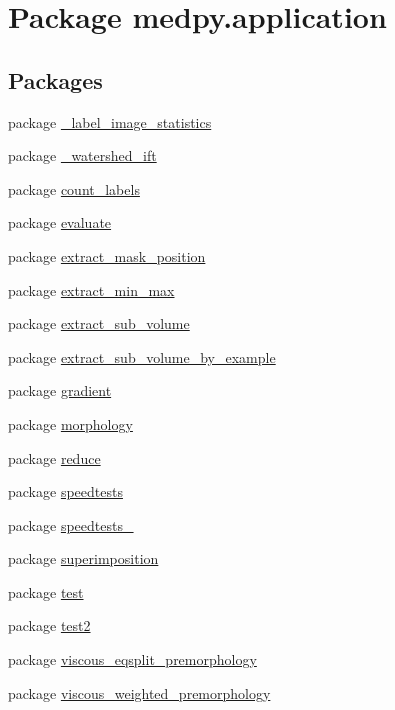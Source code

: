 \hypertarget{namespacemedpy_1_1application}{
\section{Package medpy.application}
\label{namespacemedpy_1_1application}
}
\subsection*{Packages}
\begin{DoxyCompactItemize}
\item 
package \hyperlink{namespacemedpy_1_1application_1_1__label__image__statistics}{\_\-label\_\-image\_\-statistics}
\item 
package \hyperlink{namespacemedpy_1_1application_1_1__watershed__ift}{\_\-watershed\_\-ift}
\item 
package \hyperlink{namespacemedpy_1_1application_1_1count__labels}{count\_\-labels}
\item 
package \hyperlink{namespacemedpy_1_1application_1_1evaluate}{evaluate}
\item 
package \hyperlink{namespacemedpy_1_1application_1_1extract__mask__position}{extract\_\-mask\_\-position}
\item 
package \hyperlink{namespacemedpy_1_1application_1_1extract__min__max}{extract\_\-min\_\-max}
\item 
package \hyperlink{namespacemedpy_1_1application_1_1extract__sub__volume}{extract\_\-sub\_\-volume}
\item 
package \hyperlink{namespacemedpy_1_1application_1_1extract__sub__volume__by__example}{extract\_\-sub\_\-volume\_\-by\_\-example}
\item 
package \hyperlink{namespacemedpy_1_1application_1_1gradient}{gradient}
\item 
package \hyperlink{namespacemedpy_1_1application_1_1morphology}{morphology}
\item 
package \hyperlink{namespacemedpy_1_1application_1_1reduce}{reduce}
\item 
package \hyperlink{namespacemedpy_1_1application_1_1speedtests}{speedtests}
\item 
package \hyperlink{namespacemedpy_1_1application_1_1speedtests__2}{speedtests\_}
\item 
package \hyperlink{namespacemedpy_1_1application_1_1superimposition}{superimposition}
\item 
package \hyperlink{namespacemedpy_1_1application_1_1test}{test}
\item 
package \hyperlink{namespacemedpy_1_1application_1_1test2}{test2}
\item 
package \hyperlink{namespacemedpy_1_1application_1_1viscous__eqsplit__premorphology}{viscous\_\-eqsplit\_\-premorphology}
\item 
package \hyperlink{namespacemedpy_1_1application_1_1viscous__weighted__premorphology}{viscous\_\-weighted\_\-premorphology}
\end{DoxyCompactItemize}
